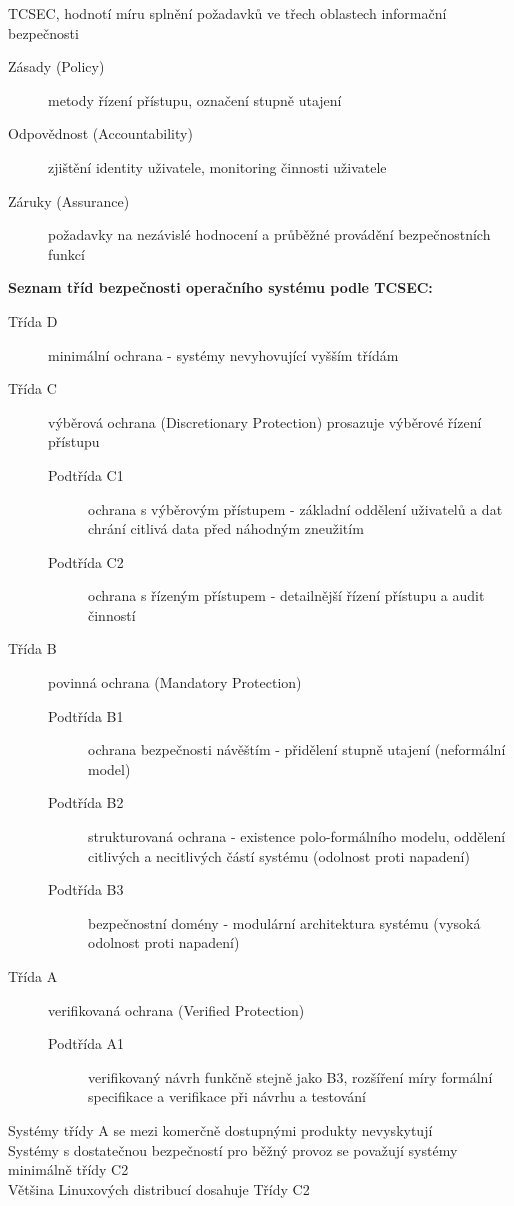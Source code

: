 \documentclass[a4paper,12pt]{article}
\renewcommand{\b}[1]{\textbf{#1}} %
\begin{document}
\vspace{4 mm}
TCSEC, hodnotí míru splnění požadavků ve třech oblastech informační bezpečnosti~\cite{PrezentaceBIS}
\begin{description}
 \item[Zásady (Policy)] metody řízení přístupu, označení stupně utajení
 \item[Odpovědnost (Accountability)] zjištění identity uživatele, monitoring činnosti uživatele
 \item[Záruky (Assurance)] požadavky na nezávislé hodnocení a průběžné provádění bezpečnostních funkcí
 \end{description}
\b{Seznam tříd bezpečnosti operačního systému podle TCSEC:}
\begin{description}
\item[Třída D] minimální ochrana - systémy nevyhovující vyšším třídám
\item[Třída C] výběrová ochrana (Discretionary Protection) prosazuje výběrové řízení přístupu
\begin{description}
\item[Podtřída C1] ochrana s výběrovým přístupem - základní oddělení uživatelů a dat chrání citlivá data před náhodným zneužitím
\item[Podtřída C2] ochrana  s řízeným přístupem - detailnější řízení přístupu a audit činností
\end{description}
\item[Třída B] povinná ochrana (Mandatory Protection)
\begin{description}
\item[Podtřída B1] ochrana bezpečnosti návěštím - přidělení stupně utajení (neformální model)
\item[Podtřída B2] strukturovaná ochrana - existence polo-formálního modelu, oddělení citlivých a necitlivých částí systému (odolnost proti napadení)
\item[Podtřída B3] bezpečnostní domény - modulární architektura systému (vysoká odolnost proti napadení)
\end{description}
\item[Třída A] verifikovaná ochrana (Verified Protection)
\begin{description}
\item[Podtřída A1] verifikovaný návrh funkčně stejně jako B3, rozšíření míry formální specifikace a verifikace při návrhu a testování 
\end{description}
\end{description}
Systémy třídy A se mezi komerčně dostupnými produkty nevyskytují\\
Systémy s dostatečnou bezpečností pro běžný provoz se považují systémy minimálně třídy C2~\cite{PrezentaceBIS}\\
Většina Linuxových distribucí dosahuje Třídy C2~\cite{LinuxDictionary}
\end{document}
